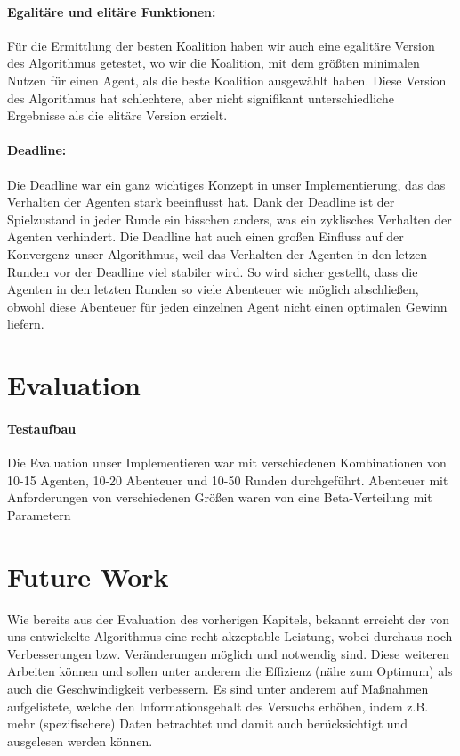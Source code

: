 \documentclass[fleqn,10pt]{article} %
\begin{document}
\paragraph{Egalitäre und elitäre Funktionen:} Für die Ermittlung der besten Koalition haben wir auch eine egalitäre Version des Algorithmus getestet, wo wir die Koalition, mit dem größten minimalen Nutzen für einen Agent, als die beste Koalition ausgewählt haben. Diese Version des Algorithmus hat schlechtere, aber nicht signifikant unterschiedliche Ergebnisse als die elitäre Version erzielt.


\paragraph{Deadline:}
Die Deadline war ein ganz wichtiges Konzept in unser Implementierung, das das Verhalten der Agenten stark beeinflusst hat. Dank der Deadline ist der Spielzustand in jeder Runde ein bisschen anders, was ein zyklisches Verhalten der Agenten verhindert. Die Deadline hat auch einen großen Einfluss auf der Konvergenz unser Algorithmus, weil das Verhalten der Agenten in den letzen Runden vor der Deadline viel stabiler wird. So wird sicher gestellt, dass die Agenten in den letzten Runden so viele Abenteuer wie möglich abschließen, obwohl diese Abenteuer für jeden einzelnen Agent nicht einen optimalen Gewinn liefern.

\section{Evaluation}
\label{sec:Evaluation}
\paragraph{Testaufbau}
Die Evaluation unser Implementieren war mit verschiedenen Kombinationen von 10-15 Agenten, 10-20 Abenteuer und 10-50 Runden durchgeführt. Abenteuer mit Anforderungen von verschiedenen Größen waren von eine Beta-Verteilung mit Parametern  



\section{Future Work}
\label{sec:Future}

Wie bereits aus der Evaluation des vorherigen Kapitels, bekannt erreicht der von uns entwickelte Algorithmus eine recht akzeptable Leistung, wobei durchaus noch Verbesserungen bzw. Veränderungen möglich und notwendig sind. Diese weiteren Arbeiten können und sollen unter anderem die Effizienz (nähe zum Optimum) als auch die Geschwindigkeit verbessern. Es sind unter anderem auf Maßnahmen aufgelistete, welche den Informationsgehalt des Versuchs erhöhen, indem z.B. mehr (spezifischere) Daten betrachtet und damit auch berücksichtigt und ausgelesen werden können.
\end{document}
